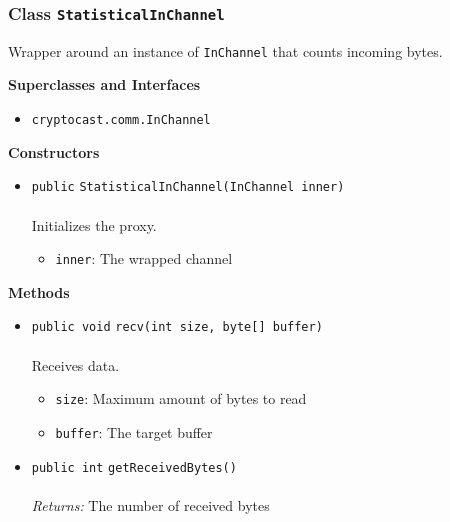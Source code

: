 \subsubsection{Class \lstinline|StatisticalInChannel|}
Wrapper around an instance of \lstinline|InChannel| that counts incoming bytes. \\
\noindent\begin{minipage}[t]{5cm}
\vspace{0.3em}
\hspace*{2em}
\vspace{0.3em}
\end{minipage}



\textbf{\sffamily Superclasses and Interfaces}
\begin{itemize}
\item \lstinline|cryptocast.comm.InChannel|
\end{itemize}


\textbf{\sffamily Constructors}
\begin{itemize}
\item \lstinline|public| \lstinline|StatisticalInChannel|\lstinline|(InChannel inner)|\\ \\[-0.6em]
Initializes the proxy.
\begin{itemize}
\item \lstinline|inner|: The wrapped channel
\end{itemize}



\end{itemize}


\textbf{\sffamily Methods}
\begin{itemize}
\item \lstinline|public void| \lstinline|recv|\lstinline|(int size, byte[] buffer)|\\ \\[-0.6em]
Receives data.
\begin{itemize}
\item \lstinline|size|: Maximum amount of bytes to read
\item \lstinline|buffer|: The target buffer
\end{itemize}



\item \lstinline|public int| \lstinline|getReceivedBytes|\lstinline|()|\\ \\[-0.6em]
\emph{Returns:} The number of received bytes



\end{itemize}

